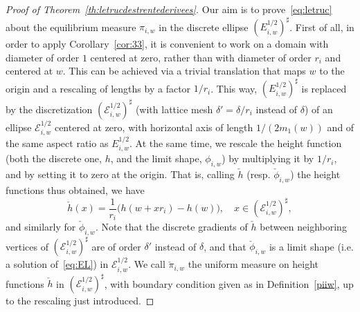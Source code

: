 \documentclass[10pt]{amsart}
\theoremstyle{definition}\newtheorem{defi}[theo]{Definition}\newtheorem{rema}[theo]{Remark}\newtheorem{exam}[theo]{Example}\newtheorem{exem}[theo]{Example}\newtheorem{nota}[theo]{Notation}
\newcommand{\clE}{\mathcal{E}}
\renewcommand{\d}{{\sharp }}
\begin{document}
\begin{proof}[Proof of Theorem~\ref{th:letrucdestrentederivees}]
Our aim is to prove~\eqref{eq:letruc} about the equilibrium measure $\pi_{i,w}$ in the discrete ellipse $(E^{1/2}_{i,w})^\d$. First of all, in order to apply Corollary~\ref{cor:33}, it is convenient to work on a domain with diameter of order $1$ centered at zero, rather than with diameter of order $r_i$ and centered at $w$. This can be achieved via a trivial translation that maps $w$ to the origin and a rescaling of lengths by a factor $1/r_i$. This way, $(E^{1/2}_{i,w})^\d$ is replaced by the discretization $(\clE^{1/2}_{i,w})^{\d}$ (with lattice mesh $\delta'=\delta/r_i$ instead of $\delta$) of an ellipse $\clE_{i,w}^{1/2}$ centered at zero, with horizontal axis of length $1/(2m_1(w))$ and of the same aspect ratio as $E^{1/2}_{i,w}$. At the same time, we rescale the height function (both the discrete one, $h$, and the limit shape, $\phi_{i,w}$) by multiplying it by $1/r_i$, and by setting it to zero at the origin. That is, calling $\check h$ (resp. $\check
\phi_{i,w}$) the height functions thus obtained, we have
\begin{equation}
\check h(x)=\frac1{r_i}\big(h(w+xr_i)-h(w)\big), \quad x\in \left(\clE^{1/2}_{i,w}\right)^\d,
\end{equation}
and similarly for $\check \phi_{i,w}$. Note that the discrete gradients of $\check h$ between neighboring vertices of $(\clE^{1/2}_{i,w})^{\d}$ are of order $\delta'$ instead of $\delta$, and that $\check \phi_{i,w}$ is a limit shape (i.e. a solution of~\eqref{eq:EL}) in $\clE^{1/2}_{i,w}$. We call $\check\pi_{i,w}$ the uniform measure on height functions $\check h$ in $(\clE^{1/2}_{i,w})^{\d}$, with boundary condition given as in Definition~\ref{piiw}, up to the rescaling just introduced.


\end{proof}
\end{document}
